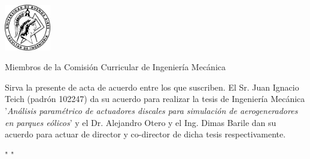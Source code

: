 \documentclass{letter}
\newcommand{\thesisname}{Análisis paramétrico de actuadores discales para simulación de aerogeneradores en parques eólicos}
\begin{document}
\begin{letter}{\includegraphics[width=0.15\textwidth]{Logo-fiuba.png}\hfill}
\opening{Miembros de la Comisión Curricular de Ingeniería Mecánica}
Sirva la presente de acta de acuerdo entre los que suscriben. El Sr. Juan Ignacio Teich (padrón 102247) da su acuerdo para realizar la tesis de Ingeniería Mecánica '\textit{\thesisname}' y el Dr. Alejandro Otero y el Ing. Dimas Barile dan su acuerdo para actuar de director y co-director de dicha tesis respectivamente.
\closing{" "}
\end{letter}
\end{document}
